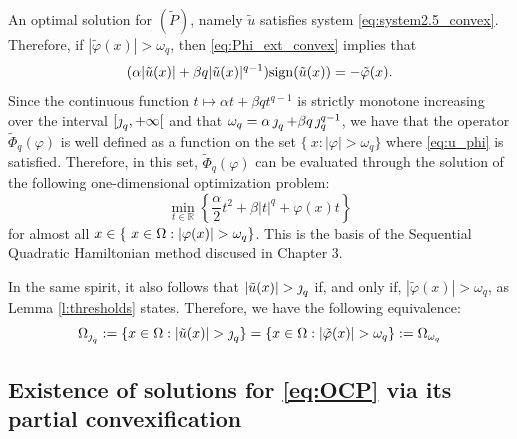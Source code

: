 \begin{remark}\label{rmrk:2}
   An optimal solution for $(\tilde{P})$, namely $\tilde {u}$ satisfies system \eqref{eq:system2.5_convex}. Therefore, if $|\tilde{\varphi}(x)|>\omega_q$, then \eqref{eq:Phi_ext_convex} implies that 
   \begin{equation}
   (\alpha|\tilde{u}(x)|+\beta q |\tilde{u}(x)|^{q-1})\sign(\tilde{u}(x))= -\tilde{\varphi}(x). \label{eq:u_phi} %
   \end{equation}
   Since the continuous function $t\mapsto \alpha t+\beta q t^{q-1}$ is strictly monotone increasing over the interval $[\operatorname{\jmath}_q,+\infty[$ and that $\omega_q=\alpha \operatorname{\jmath}_q+\beta q \operatorname{\jmath}_q^{q-1}$, we have that  the operator $\tilde\Phi_q(\varphi)$ is well defined as a function on the set $\{\ x: |\varphi|>\omega_q\}$ where \eqref{eq:u_phi} is satisfied. Therefore, in this set, $\tilde\Phi_q(\varphi)$ can be evaluated through the solution of the following one-dimensional optimization problem:
   \begin{equation}\label{eq:prox_lq}
   	\min_{t\in \mathbb{R}} \left\{ \frac{\alpha}{2}t^2 + \beta |t|^q + \varphi(x) t \right\}
   \end{equation}
for almost all $x \in \{\ x\in \om: |\varphi(x)|>\omega_q\}$. This is the basis of the Sequential Quadratic Hamiltonian method 
discused in Chapter 3.
   
In the same spirit, it also follows that $|\tilde{u}(x)|>\jump_q$ if, and only if, 
$|\tilde{\varphi}(x)|>\omega_q$, as Lemma \ref{l:thresholds} states. Therefore, we have the following equivalence: 
   \begin{equation}\label{eq:equ_sets}
       \Omega_{\jump_q}:=\{x\in \om: |\tilde{u}(x)|>\jump_q\}=\{x\in \om: |\tilde{\varphi}(x)|>\omega_q\}:=\om_{\omega_q}
   \end{equation}
\end{remark}

\subsection{Existence of solutions for \eqref{eq:OCP} via its partial convexification} 

